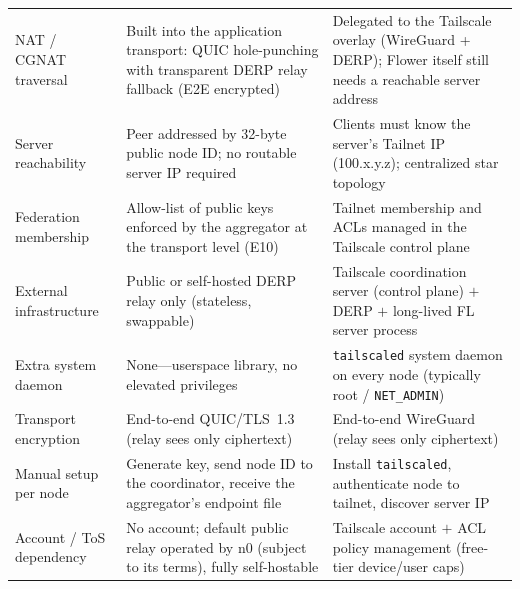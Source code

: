 \documentclass[a4paper,fleqn]{cas-dc}
\providecommand{\DIFaddendFL}{} %
\begin{document}
\begin{table}[t]
\begin{tabular}{p{2.4cm} p{6.2cm} p{6.2cm}}
\midrule
NAT / CGNAT traversal & Built into the application transport: QUIC hole-punching with transparent DERP relay fallback (E2E encrypted) & Delegated to the Tailscale overlay (WireGuard + DERP); Flower itself still needs a reachable server address \\
Server reachability & Peer addressed by 32-byte public node ID; no routable server IP required & Clients must know the server's Tailnet IP (100.x.y.z); centralized star topology \\
Federation membership & Allow-list of public keys enforced by the aggregator at the transport level (E10) & Tailnet membership and ACLs managed in the Tailscale control plane \\
External infrastructure & Public or self-hosted DERP relay only (stateless, swappable) & Tailscale coordination server (control plane) $+$ DERP $+$ long-lived FL server process \\
Extra system daemon & None---userspace library, no elevated privileges & \texttt{tailscaled} system daemon on every node (typically root / \texttt{NET\_ADMIN}) \\
Transport encryption & End-to-end QUIC/TLS~1.3 (relay sees only ciphertext) & End-to-end WireGuard (relay sees only ciphertext) \\
Manual setup per node & Generate key, send node ID to the coordinator, receive the aggregator's endpoint file & Install \texttt{tailscaled}, authenticate node to tailnet, discover server IP \\
Account / ToS dependency & No account; default public relay operated by n0 (subject to its terms), fully self-hostable & Tailscale account $+$ ACL policy management (free-tier device/user caps) \\
\bottomrule
\end{tabular}
\DIFaddendFL \end{table}
\end{document}
